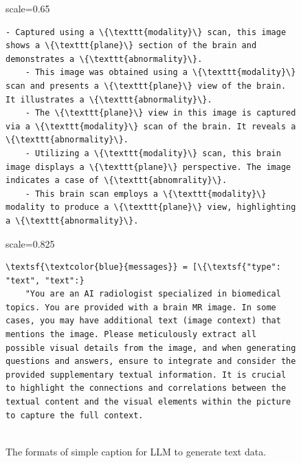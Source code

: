 \begin{figure}[t]
\centering
\begin{minipage}{1\linewidth}
    \begin{adjustbox}{scale=0.65}
    \begin{minipage}{1.52\columnwidth}
    \begin{Verbatim}[frame=single, numbersep=5pt,
                     commandchars=\\\{\}]
    - Captured using a \{\texttt{modality}\} scan, this image shows a \{\texttt{plane}\} section of the brain and demonstrates a \{\texttt{abnormality}\}.
    - This image was obtained using a \{\texttt{modality}\} scan and presents a \{\texttt{plane}\} view of the brain. It illustrates a \{\texttt{abnormality}\}.
    - The \{\texttt{plane}\} view in this image is captured via a \{\texttt{modality}\} scan of the brain. It reveals a \{\texttt{abnormality}\}.
    - Utilizing a \{\texttt{modality}\} scan, this brain image displays a \{\texttt{plane}\} perspective. The image indicates a case of \{\texttt{abnomrality}\}.
    - This brain scan employs a \{\texttt{modality}\} modality to produce a \{\texttt{plane}\} view, highlighting a \{\texttt{abnormality}\}.
    \end{Verbatim}
    \end{minipage}
    \end{adjustbox}
    \centering
    \vspace{-6pt}
    \caption{The formats of simple caption for LLM to generate text data.}
    \label{figA}
\end{minipage}

\vspace{12pt}

\centering
\begin{minipage}{1\linewidth}
    \centering
    \begin{adjustbox}{scale=0.825}
    \begin{minipage}{1.2\columnwidth}
    \begin{Verbatim}[frame=single, numbersep=5pt,
                     commandchars=\\\{\}, breaklines=true,  
                     breaksymbolleft={}, breaksymbolright={}]
\textsf{\textcolor{blue}{messages}} = [\{\textsf{"type": "text", "text":} 
    "You are an AI radiologist specialized in biomedical topics. You are provided with a brain MR image. In some cases, you may have additional text (image context) that mentions the image. Please meticulously extract all possible visual details from the image, and when generating questions and answers, ensure to integrate and consider the provided supplementary textual information. It is crucial to highlight the connections and correlations between the textual content and the visual elements within the picture to capture the full context.


\end{Verbatim}
\end{minipage}
\end{adjustbox}
\end{minipage}
\end{figure}
